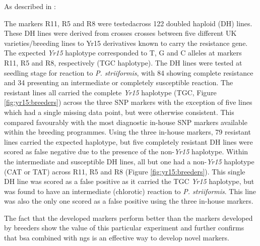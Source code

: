 As described in \citet{Ramirez-Gonzalez2015b}:  
\begin{blockquote} The markers
 R11, R5 and R8 were testedacross 122 doubled haploid (DH) lines. 
These DH lines were derived from crosses crosses between five different UK varieties/breeding lines to Yr15 derivatives known to carry the resistance gene. 
The expected \textit{Yr15} haplotype corresponded to T, G and C alleles at markers R11, R5 and R8, respectively (TGC haplotype). 
The DH lines were tested at seedling stage for reaction to \textit{P. striiformis}, with 84 showing complete resistance and 34 presenting an intermediate or completely susceptible reaction.
The resistant lines all carried the complete \textit{Yr15} haplotype (TGC, Figure \ref{fig:yr15:breeders}) across the three SNP markers with the exception of five lines which had a single missing data point, but were otherwise consistent. 
This compared favourably with the most diagnostic in-house SNP markers available within the breeding programmes. 
Using the three in-house markers, 79 resistant lines carried the expected haplotype, but five completely resistant DH lines were scored as false negative due to the presence of the non-\textit{Yr15} haplotype. 
Within the intermediate and susceptible DH lines, all but one had a non-\textit{Yr15} haplotype (CAT or TAT) across R11, R5 and R8 (Figure \ref{fig:yr15:breeders}). This single DH line was scored as a false positive as it carried the TGC \textit{Yr15} haplotype, but was found to have an intermediate (chlorotic) reaction to \textit{P. striiformis}. This line was also the only one scored as a false positive using the three in-house markers. \end{blockquote}
The fact that the developed markers perform better than the markers developed by breeders show the value of this particular experiment and further confirms that \acrshort{bsa} combined with \acrshort{ngs} is an effective way to develop novel markers. 

